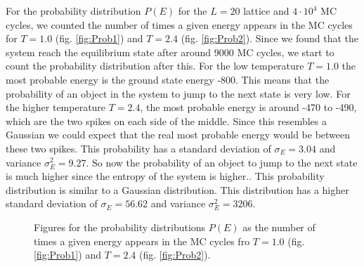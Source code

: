 \documentclass[12pt,a4paper,english]{article}
\begin{document}
For the probability distribution $P(E)$ for the $L=20$ lattice and $4\cdot10^4$ MC cycles, we counted the number of times a given energy appears in the MC cycles for $T=1.0$ (fig. \ref{fig:Prob1}) and $T=2.4$ (fig. \ref{fig:Prob2}). Since we found that the system reach the equilibrium state after around 9000 MC cycles, we start to count the probability distribution after this. For the low temperature $T=1.0$ the most probable energy is the ground state energy -800. This means that the probability of an object in the system to jump to the next state is very low. For the higher temperature $T=2.4$, the most probable energy is around -470 to -490, which are the two spikes on each side of the middle. Since this resembles a Gaussian we could expect that the real most probable energy would be between these two spikes. This probability has a standard deviation of $\sigma_E=3.04$ and variance $\sigma_E^2=9.27$. So now the probability of an object to jump to the next state is much higher since the entropy of the system is higher.. This probability distribution is similar to a Gaussian distribution. This distribution has a higher standard deviation of $\sigma_E=56.62$ and variance $\sigma_E^2=3206$.

\begin{figure}[htbp]
	\hspace{0.5em}
	\caption{Figures for the probability distributions $P(E)$ as the number of times a given energy appears in the MC cycles fro $T=1.0$ (fig. \ref{fig:Prob1}) and $T=2.4$ (fig. \ref{fig:Prob2}).\label{fig:prob_dist}}
\end{figure}
\end{document}
